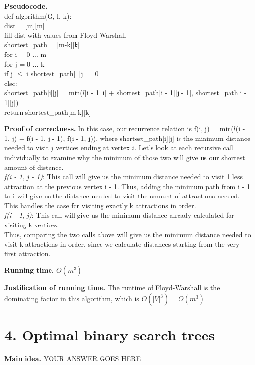 \documentclass[11pt]{article}
\begin{document}
\noindent
\textbf{Pseudocode.}\\
def algorithm(G, l, k): \\
\indent dist = [m][m] \\
\indent fill dist with values from Floyd-Warshall \\
\indent shortest\_path = [m-k][k] \\
\indent for i = 0 ... m \\
\indent\indent for j = 0 ... k \\
\indent\indent\indent if j $\leq$ i shortest\_path[i][j] = 0 \\
\indent\indent\indent else:\\
\indent\indent\indent\indent shortest\_path[i][j] = min($l$[i - 1][i] + shortest\_path[i - 1][j - 1], shortest\_path[i - 1][j]) \\
\indent return shortest\_path[m-k][k]

\noindent
\textbf{Proof of correctness.}
In this case, our recurrence relation is f(i, j) = min($l$(i - 1, j) + f(i - 1, j - 1), f(i - 1, j)), where shortest\_path[i][j] is the minimum distance needed to visit $j$ vertices ending at vertex $i$.  Let's look at each recursive call individually to examine why the minimum of those two will give us our shortest amount of distance.\\
\textit{f(i - 1, j - 1)}: This call will give us the minimum distance needed to visit 1 less attraction at the previous vertex i - 1.  Thus, adding the minimum path from i - 1 to i will give us the distance needed to visit the amount of attractions needed.  This handles the case for visiting exactly k attractions in order. \\
\textit{f(i - 1, j)}: This call will give us the minimum distance already calculated for visiting k vertices. \\
Thus, comparing the two calls above will give us the minimum distance needed to visit k attractions in order, since we calculate distances starting from the very first attraction.



\noindent
\textbf{Running time.}
$O(m^3)$


\noindent
\textbf{Justification of running time.}
The runtime of Floyd-Warshall is the dominating factor in this algorithm, which is $O(|V|^3) = O(m^3)$


\newpage
\section*{4. Optimal binary search trees}
\noindent
\textbf{Main idea.}
YOUR ANSWER GOES HERE
\end{document}
